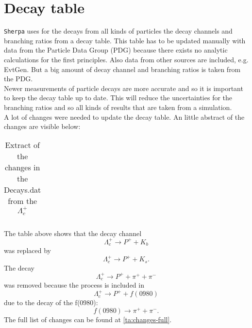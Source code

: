 \section{Decay table}
\texttt{Sherpa} uses for the decays from all kinds of particles the decay channels 
and branching ratios from a decay table. This table has to be 
updated manually with data from the Particle Data Group (PDG) because there 
exists no analytic calculations for the first principles. Also data from other 
sources are included, e.g. EvtGen. But a big amount of decay channel and 
branching ratios is taken from the PDG.\\
Newer measurements of particle decays are more accurate and so it is important 
to keep the decay table up to date. This will reduce the uncertainties for the 
branching ratios and so all kinds of results that are taken from a simulation.\\
A lot of changes were needed to update the decay table. An little abstract of 
the changes are visible below:
\begin{longtable}{| c | c | c |}
  \caption{Extract of the changes in the Decays.dat from the \(\Lambda_c^+\)}\label{ta:changes-decays}\\ 
  \hline
  
\end{longtable}
The table above shows that the decay channel
\begin{equation}
  \Lambda_c^+ \rightarrow P^+ + K_b \nonumber
\end{equation}
was replaced by
\begin{equation}
  \Lambda_c^+ \rightarrow P^+ + K_s.  \nonumber
\end{equation}
The decay
\begin{equation}
  \Lambda_c^+ \rightarrow P^+ + \pi^+ + \pi^- \nonumber
\end{equation}
was removed because the process is included in
\begin{equation}
  \Lambda_c^+ \rightarrow P^+ + f(0980) \nonumber
\end{equation}
due to the decay of the f(0980):
\begin{equation}
  f(0980) \rightarrow \pi^+ + \pi^-. \nonumber
\end{equation}
The full list of changes can be found at {\ref{ta:changes-full}}.

